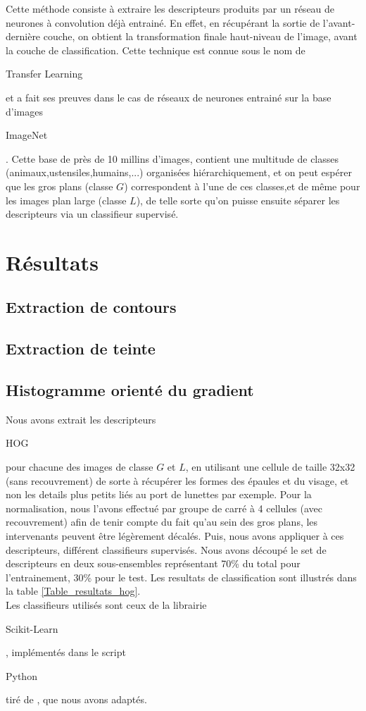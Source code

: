 \documentclass{book}
\begin{document}
Cette méthode consiste à extraire les descripteurs produits par un réseau de neurones à convolution déjà entrainé.
En effet, en récupérant la sortie de l'avant-dernière couche, on obtient la transformation finale haut-niveau de l'image, 
avant la couche de classification.
Cette technique est connue sous le nom de \begin{itshape}Transfer Learning\end{itshape} \cite{DBLP:journals/corr/YosinskiCBL14} 
et a fait ses preuves dans le cas de réseaux de neurones entrainé sur la base 
d'images \begin{itshape}ImageNet\end{itshape} \cite{imagenet_cvpr09}.
Cette base de près de 10 millins d'images, contient une multitude de classes (animaux,ustensiles,humains,...) organisées hiérarchiquement, 
et on peut espérer que les gros plans (classe $G$) correspondent à l'une de ces classes,et de même pour les images plan 
large (classe $L$), de telle sorte qu'on puisse ensuite séparer les descripteurs via un classifieur 
supervisé.

\chapter{Résultats}
\section{Extraction de contours}
\section{Extraction de teinte}
\section{Histogramme orienté du gradient}
Nous avons extrait les descripteurs \begin{itshape}HOG\end{itshape} pour chacune des images de classe $G$ et $L$, en utilisant 
une cellule de taille 32x32 (sans recouvrement) de sorte à récupérer les formes des épaules et du visage, et non les details 
plus petits liés au port de lunettes par exemple. Pour la normalisation, nous l'avons effectué par groupe de carré à 4 cellules (avec
recouvrement) afin de tenir compte du fait qu'au sein des gros plans, les intervenants peuvent être légèrement décalés.
Puis, nous avons appliquer à ces descripteurs, différent classifieurs supervisés. 
Nous avons découpé le set de descripteurs en deux sous-ensembles représentant 70\% du total pour l'entrainement, 
30\% pour le test. Les resultats de classification sont illustrés dans la table \ref{Table_resultats_hog}.\\
Les classifieurs utilisés sont ceux de la librairie \begin{itshape}Scikit-Learn\end{itshape}, implémentés dans le script 
\begin{itshape}Python\end{itshape} tiré de \cite{scikit_bench}, que nous avons adaptés.
\end{document}
